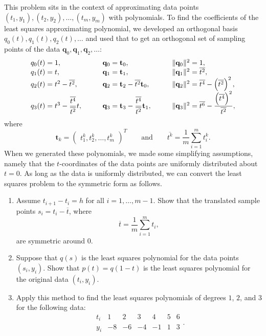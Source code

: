\documentclass[10pt]{extarticle}
\begin{document}
\begin{problem}[Problem 3]
This problem sits in the context of approximating data points $(t_1,y_1),(t_2,y_2),\dots,(t_m,y_m)$ with polynomials. To find the coefficients of the least squares approximating polynomial, we developed an orthogonal basis $q_0(t),q_1(t),q_2(t),\dots$ and used that to get an orthogonal set of sampling points of the data $\mathbf{q}_0,\mathbf{q}_1,\mathbf{q}_2,\dots$:
\[
\setlength\arraycolsep{15pt}
\begin{array}{lll}
q_0(t)=1, & \mathbf{q}_0=\mathbf{t}_0, & \lVert \mathbf{q}_0\rVert^2=1,\\
q_1(t)=t, & \mathbf{q}_1=\mathbf{t}_1, & \lVert \mathbf{q}_1\rVert^2=\overline{t^2},\\
q_2(t)=t^2-\overline{t^2}, & \mathbf{q}_2=\mathbf{t}_2-\overline{t^2}\mathbf{t}_0, & \lVert \mathbf{q}_2\rVert^2=\overline{t^4}-\left(\overline{t^2}\right)^2,\\
q_3(t)=t^3-\dfrac{\overline{t^4}}{\overline{t^2}}t, & \mathbf{q}_3=\mathbf{t}_3-\dfrac{\overline{t^4}}{\overline{t^2}}\mathbf{t}_1, & \lVert \mathbf{q}_3\rVert^2=\overline{t^6}-\dfrac{\left(\overline{t^4}\right)^2}{\overline{t^2}},
\end{array}
\]
where
\[
\mathbf{t}_k=\begin{pmatrix}t_1^k,t_2^k,\dots,t_m^k\end{pmatrix}^T
\qquad \text{and} \qquad
\overline{t^k}=\frac{1}{m}\sum_{i=1}^m t_i^k.
\]
When we generated these polynomials, we made some simplifying assumptions, namely that the $t$-coordinates of the data points are uniformly distributed about $t=0$. As long as the data is uniformly distributed, we can convert the least squares problem to the symmetric form as follows.
\begin{enumerate}[label=(\alph*)]
\item Assume $t_{i+1}-t_i=h$ for all $i=1,\dots,m-1$. Show that the translated sample points $s_i=t_i-\overline{t}$, where
\[
\overline{t}=\frac{1}{m}\sum_{i=1}^m t_i,
\]
are symmetric around $0$.
\item Suppose that $q(s)$ is the least squares polynomial for the data points $(s_i,y_i)$. Show that $p(t)=q(1-t)$ is the least squares polynomial for the original data $(t_i,y_i)$.
\item Apply this method to find the least squares polynomials of degrees $1$, $2$, and $3$ for the following data:
\[
\begin{array}{c|cccccc}
t_i & 1 & 2 & 3 & 4 & 5 & 6 \\ \hline
y_i & -8 & -6 & -4 & -1 & 1 & 3
\end{array}.
\]
\end{enumerate}
\end{problem}
\end{document}
